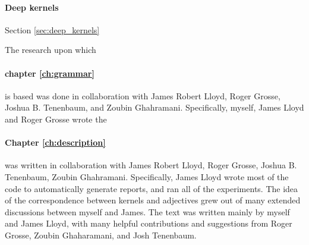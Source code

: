 \paragraph{Deep kernels}
Section \ref{sec:deep_kernels}

The research upon which \paragraph{chapter \ref{ch:grammar}} is based was done in collaboration with James Robert Lloyd, Roger Grosse, Joshua B. Tenenbaum, and Zoubin Ghahramani.
Specifically, myself, James Lloyd and Roger Grosse wrote the

\paragraph{Chapter \ref{ch:description}} was written in collaboration with James Robert Lloyd, Roger Grosse, Joshua B. Tenenbaum, Zoubin Ghahramani.
Specifically, James Lloyd wrote most of the code to automatically generate reports, and ran all of the experiments.
The idea of the correspondence between kernels and adjectives grew out of many extended discussions between myself and James.
The text was written mainly by myself and James Lloyd, with many helpful contributions and suggestions from Roger Grosse, Zoubin Ghaharamani, and Josh Tenenbaum.


\outbpdocument{


}


